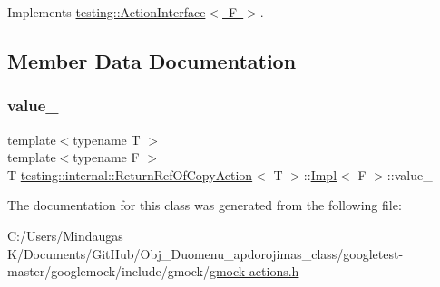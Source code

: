 Implements \mbox{\hyperlink{classtesting_1_1_action_interface_a20f8624fcea1786f2992b358760422a0}{testing\+::\+Action\+Interface$<$ F $>$}}.



\subsection{Member Data Documentation}
\mbox{\label{classtesting_1_1internal_1_1_return_ref_of_copy_action_1_1_impl_ad253b5cad2707636b8b19970708905c3}} 
\subsubsection{\texorpdfstring{value\_}{value\_}}
{\footnotesize\ttfamily template$<$typename T $>$ \\
template$<$typename F $>$ \\
T \mbox{\hyperlink{classtesting_1_1internal_1_1_return_ref_of_copy_action}{testing\+::internal\+::\+Return\+Ref\+Of\+Copy\+Action}}$<$ T $>$\+::\mbox{\hyperlink{classtesting_1_1internal_1_1_return_ref_of_copy_action_1_1_impl}{Impl}}$<$ F $>$\+::value\+\_\+\hspace{0.3cm}{\ttfamily [private]}}



The documentation for this class was generated from the following file\+:\begin{DoxyCompactItemize}
\item 
C\+:/\+Users/\+Mindaugas K/\+Documents/\+Git\+Hub/\+Obj\+\_\+\+Duomenu\+\_\+apdorojimas\+\_\+class/googletest-\/master/googlemock/include/gmock/\mbox{\hyperlink{googletest-master_2googlemock_2include_2gmock_2gmock-actions_8h}{gmock-\/actions.\+h}}\end{DoxyCompactItemize}
